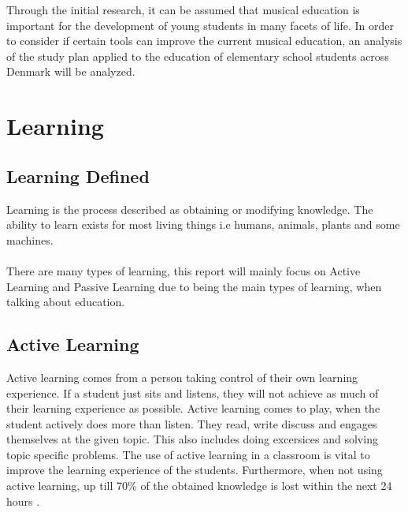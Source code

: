 Through the initial research, it can be assumed that musical education is important for the development of young students in many facets of life. In order to consider if certain tools can improve the current musical education, an analysis of the study plan applied to the education of elementary school students across Denmark will be analyzed.
\section{Learning}
\subsection{Learning Defined}\label{sec:learning}
Learning is the process described as obtaining or modifying knowledge. The ability to learn exists for most living things i.e humans, animals, plants and some machines. \\
\\
There are many types of learning, this report will mainly focus on Active Learning and Passive Learning due to being the main types of learning, when talking about education.

\subsection*{Active Learning}
Active learning comes from a person taking control of their own learning experience. If a student just sits and listens, they will not achieve as much of their learning experience as possible. Active learning comes to play, when the student actively does more than listen. They read, write discuss and engages themselves at the given topic. This also includes doing excersices and solving topic specific problems\cite{activelearning}. The use of active learning in a classroom is vital to improve the learning experience of the students. Furthermore, when not using active learning, up till 70\% of the obtained knowledge is lost within the next 24 hours \cite{learning}.\\

